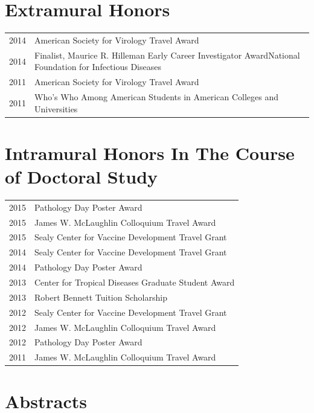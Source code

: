 \documentclass[11pt]{report}	%
\theoremstyle{definition}
\theoremstyle{remark}
\begin{document}
\section*{Extramural Honors}
\begin{tabu} to \textwidth {X[.25,r]|X[L]}
	2014& American Society for Virology Travel Award\\
	2014& Finalist, Maurice R. Hilleman Early Career Investigator Award\newline National Foundation for Infectious Diseases\\
	2011& American Society for Virology Travel Award\\
	2011& Who's Who Among American Students in American Colleges and Universities\\
\end{tabu}

\section*{Intramural Honors In The Course of Doctoral Study}
\begin{tabu} to \textwidth {X[.25,r]|X[L]}
	2015& Pathology Day Poster Award\\
	2015& James W. McLaughlin Colloquium Travel Award\\
	2015& Sealy Center for Vaccine Development Travel Grant\\
	2014& Sealy Center for Vaccine Development Travel Grant\\
	2014& Pathology Day Poster Award\\
	2013& Center for Tropical Diseases Graduate Student Award\\
	2013& Robert Bennett Tuition Scholarship\\
	2012& Sealy Center for Vaccine Development Travel Grant\\
	2012& James W. McLaughlin Colloquium Travel Award\\
	2012& Pathology Day Poster Award\\
	2011& James W. McLaughlin Colloquium Travel Award\\
\end{tabu}

\section*{Abstracts}
\begin{refsection}
\nocite{Beck:2015ty}

\nocite{Beck:2014ts}

\nocite{Beck:2014tsa}

\nocite{Beck:2014tw}

\nocite{Beck:2013vv}

\nocite{Beck:2012we}

\nocite{Beck:2012wea}

\setlength\bibitemsep{.2cm} %
\newrefcontext[sorting=ydnt]	
\printbibliography[heading=none]
\end{refsection}
\end{document}
